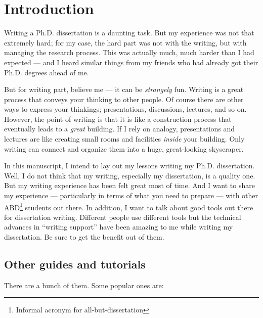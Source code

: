 \documentclass[11pt]{article}
\begin{document}
\section{Introduction}

Writing a Ph.D. dissertation is a daunting task. But my experience was not
that extremely hard; for my case, the hard part was not with the writing, but
with managing the research process. This was actually much, much harder than I
had expected --- and I heard similar things from my friends who had already
got their Ph.D. degrees ahead of me.

But for writing part, believe me --- it can be \emph{strangely} fun.  Writing
is a great process that conveys your thinking to other people.  Of course
there are other ways to express your thinkings; presentations, discussions,
lectures, and so on.  However, the point of writing is that it is like a
construction process that eventually leads to a \emph{great} building.  If I
rely on analogy, presentations and lectures are like creating small rooms and
facilities \emph{inside} your building. Only writing can connect and organize
them into a huge, great-looking skyscraper.

In this manuscript, I intend to lay out my lessons writing my Ph.D.
dissertation. Well, I do not think that my writing, especially my
dissertation, is a quality one. But my writing experience has been felt great
most of time. And I want to share my experience --- particularly in terms of
what you need to prepare --- with other ABD\footnote{Informal acronym for
all-but-dissertation} students out there. In addition, I want to talk about good
tools out there for dissertation writing.  Different people use different
tools but the technical advances in ``writing support'' have been amazing to
me while writing my dissertation.  Be sure to get the benefit out of them.

\subsection{Other guides and tutorials}
There are a bunch of them. Some popular ones are:
\end{document}
